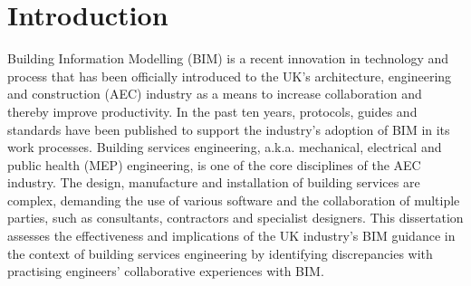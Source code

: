 \chapter{Introduction} %

\label{Chapter1} %


Building Information Modelling (BIM) is a recent innovation in technology and process that has been officially introduced to the UK's architecture, engineering and construction (AEC) industry as a means to increase collaboration and thereby improve productivity.
In the past ten years, protocols, guides and standards have been published to support the industry's adoption of BIM in its work processes.
Building services engineering, a.k.a. mechanical, electrical and public health (MEP) engineering, is one of the core disciplines of the AEC industry.
The design, manufacture and installation of building services are complex, demanding the use of various software and the collaboration of multiple parties, such as consultants, contractors and specialist designers.
This dissertation assesses the effectiveness and implications of the UK industry's BIM guidance in the context of building services engineering by identifying discrepancies with practising engineers' collaborative experiences with BIM.


\begin{comment}
The topic of interest of this research study is communication and collaboration in the architecture, engineering and construction (AEC) industry in the UK from the perspective of a building services engineer.
\hl{This interim report} starts off with a literature review that provides some context for the need for improved communication and collaboration in the industry.
It then summarises particular collaboration-related concerns raised by building services professionals during scoping discussions.
\hl{These concerns gave shape to the aim of the research study: to investigate and compare building services engineers' ``prescribed" processes for communication and collaboration with other stakeholders during Stages 4 and 5 of RIBA Plan of Work 2013 with reality.}
The report concludes with an outline of the objectives, methodology and schedule.
\end{comment}

